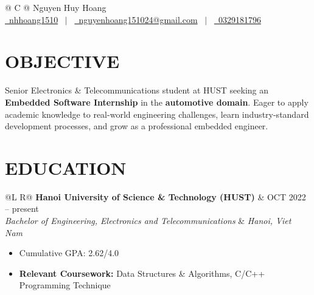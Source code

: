 \documentclass[a4paper,11pt]{article}
\begin{document}
\pagestyle{empty}


\begin{tabularx}{\linewidth}{@{} C @{}}
\Huge{Nguyen Huy Hoang} \\[7.5pt]
\href{https://github.com/nhhoang1510}{\raisebox{-0.05\height}\faGithub\ nhhoang1510} \ $|$ \
\href{mailto:nguyenhoang151024@gmail.com}{\raisebox{-0.05\height}\faEnvelope\ nguyenhoang151024@gmail.com} \ $|$ \
\href{tel:0329181796}{\raisebox{-0.05\height}\faMobile\ 0329181796} \\
\end{tabularx}


\section{OBJECTIVE}

Senior Electronics \& Telecommunications student at HUST seeking an \textbf{Embedded Software Internship} in the \textbf{automotive domain}. Eager to apply academic knowledge to real-world engineering challenges, learn industry-standard development processes, and grow as a professional embedded engineer.


\section{EDUCATION}

\begin{tabularx}{\linewidth}{@{}L R@{}}
\textbf{Hanoi University of Science \& Technology (HUST)} & OCT 2022 -- present \\
\textit{Bachelor of Engineering, Electronics and Telecommunications} & \textit{Hanoi, Viet Nam} \\
\end{tabularx}
\begin{itemize}[nosep, leftmargin=1em, itemsep=2pt, label=--]
    \item Cumulative GPA: 2.62/4.0
    \item \textbf{Relevant Coursework:} Data Structures \& Algorithms, C/C++ Programming Technique
\end{itemize}
\end{document}
